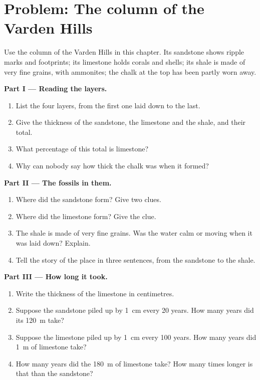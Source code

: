 \section{Problem: The column of the Varden Hills}

\begin{problem}
\label{pb:g7:sediments-and-fossils:1}
Use the column of the Varden Hills in this chapter. Its sandstone shows
ripple marks and footprints; its limestone holds corals and shells; its
shale is made of very fine grains, with ammonites; the chalk at the top
has been partly worn away.

\medskip
\noindent\textbf{Part I --- Reading the layers.}\par\nopagebreak
\begin{enumerate}[beginpenalty=10000]
  \item List the four layers, from the first one laid down to the last.
  \item Give the thickness of the sandstone, the limestone and the shale,
        and their total.
  \item What percentage of this total is limestone?
  \item Why can nobody say how thick the chalk was when it formed?
\end{enumerate}

\medskip
\noindent\textbf{Part II --- The fossils in them.}\par\nopagebreak
\begin{enumerate}[resume, beginpenalty=10000]
  \item Where did the sandstone form? Give two clues.
  \item Where did the limestone form? Give the clue.
  \item The shale is made of very fine grains. Was the water calm or
        moving when it was laid down? Explain.
  \item Tell the story of the place in three sentences, from the
        sandstone to the shale.
\end{enumerate}

\medskip
\noindent\textbf{Part III --- How long it took.}\par\nopagebreak
\begin{enumerate}[resume, beginpenalty=10000]
  \item Write the thickness of the limestone in centimetres.
  \item Suppose the sandstone piled up by \qty{1}{cm} every 20 years. How
        many years did its \qty{120}{m} take?
  \item Suppose the limestone piled up by \qty{1}{cm} every 100 years.
        How many years did \qty{1}{m} of limestone take?
  \item How many years did the \qty{180}{m} of limestone take? How many
        times longer is that than the sandstone?
\end{enumerate}
\end{problem}
